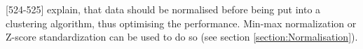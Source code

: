 


\textcite{DataMiningAndPredictiveAnalytics}[524-525] explain, that data should be normalised before being put into a clustering algorithm, thus optimising the performance. Min-max normalization or Z-score standardization can be used to do so (see section \ref{section:Normalisation}).












